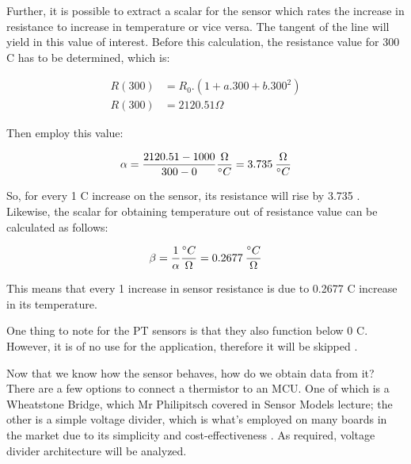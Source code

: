 Further, it is possible to extract a scalar for the sensor which rates the increase in resistance to increase in temperature or vice versa. The tangent of the line will yield in this value of interest. Before this calculation, the resistance value for 300 \degree C has to be determined, which is:

\begin{align}
    R(300) &= R_0.(1 + a.300 + b.300^2)\\
    R(300) &= 2120.51 \Omega
\end{align}

Then employ this value:

\begin{equation}
    \alpha = \frac{2120.51 - 1000}{300 - 0} \frac{\ohm}{\degree C} = 3.735 \:  \frac{\ohm}{\degree C}
\end{equation}

So, for every 1 \degree C increase on the sensor, its resistance will rise by 3.735 \ohm. Likewise, the scalar for obtaining temperature out of resistance value can be calculated as follows:

\begin{equation}
    \beta = \frac{1}{\alpha} \frac{\degree C}{\ohm} = 0.2677 \:  \frac{\degree C}{\ohm}
\end{equation}

This means that every 1 \ohm \: increase in sensor resistance is due to 0.2677 \degree C increase in its temperature.

One thing to note for the PT sensors is that they also function below 0 \degree C. However, it is of no use for the application, therefore it will be skipped \cite{Pt1000}.

Now that we know how the sensor behaves, how do we obtain data from it? There are a few options to connect a thermistor to an MCU. One of which is a Wheatstone Bridge, which Mr Philipitsch covered in Sensor Models lecture; the other is a simple voltage divider, which is what's employed on many boards in the market due to its simplicity and cost-effectiveness \cite{mksboard}. As required, voltage divider architecture will be analyzed.


